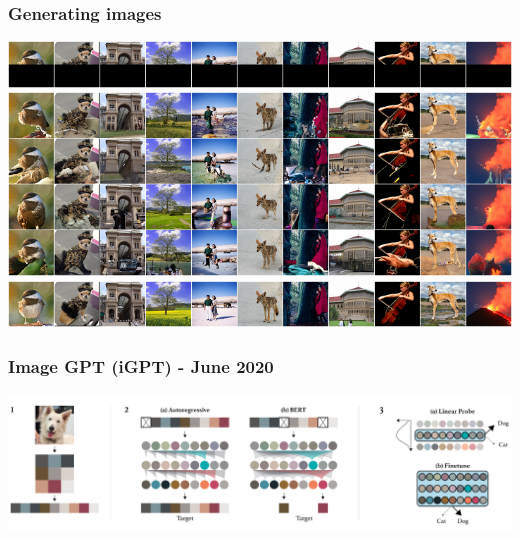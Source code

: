 \documentclass{beamer}
\begin{document}
\begin{frame}
    \frametitle{Generating images}
    \begin{center}
        \includegraphics[scale=0.45]{img/sparse_transformer_gen1.png}
        \includegraphics[scale=0.45]{img/sparse_transformer_gen2_half.png}
        \includegraphics[scale=0.45]{img/sparse_transformer_gen3.png}
    \end{center}
\end{frame}

\begin{frame}
    \frametitle{Image GPT (iGPT) \cite{igpt} - June 2020}
    \begin{center}
        \includegraphics[scale=0.29]{img/igpt_model.png}
    \end{center}
\end{frame}
\end{document}
